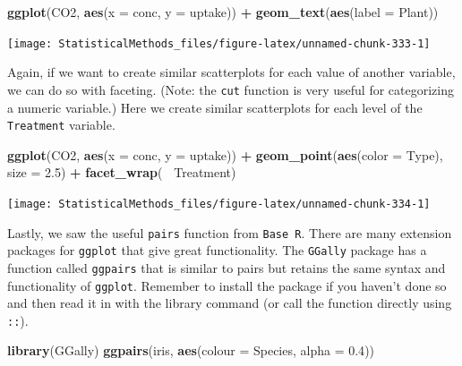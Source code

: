 \documentclass[
]{book}
\newenvironment{Shaded}{\begin{snugshade}}{\end{snugshade}}
\newcommand{\DataTypeTok}[1]{\textcolor[rgb]{0.13,0.29,0.53}{#1}}
\newcommand{\FloatTok}[1]{\textcolor[rgb]{0.00,0.00,0.81}{#1}}
\newcommand{\KeywordTok}[1]{\textcolor[rgb]{0.13,0.29,0.53}{\textbf{#1}}}
\newcommand{\NormalTok}[1]{#1}
\newcommand{\OperatorTok}[1]{\textcolor[rgb]{0.81,0.36,0.00}{\textbf{#1}}}
\newcommand{\StringTok}[1]{\textcolor[rgb]{0.31,0.60,0.02}{#1}}
\theoremstyle{definition}
\theoremstyle{definition}
\theoremstyle{definition}
\theoremstyle{remark}
\begin{document}
\begin{Shaded}
\begin{Highlighting}[]
\KeywordTok{ggplot}\NormalTok{(CO2, }\KeywordTok{aes}\NormalTok{(}\DataTypeTok{x =}\NormalTok{ conc, }\DataTypeTok{y =}\NormalTok{ uptake)) }\OperatorTok{+}\StringTok{ }
\StringTok{  }\KeywordTok{geom_text}\NormalTok{(}\KeywordTok{aes}\NormalTok{(}\DataTypeTok{label =}\NormalTok{ Plant))}
\end{Highlighting}
\end{Shaded}

\begin{center}\texttt{[image: StatisticalMethods\_files/figure-latex/unnamed-chunk-333-1]} \end{center}

Again, if we want to create similar scatterplots for each value of another variable, we can do so with faceting. (Note: the \texttt{cut} function is very useful for categorizing a numeric variable.) Here we create similar scatterplots for each level of the \texttt{Treatment} variable.

\begin{Shaded}
\begin{Highlighting}[]
\KeywordTok{ggplot}\NormalTok{(CO2, }\KeywordTok{aes}\NormalTok{(}\DataTypeTok{x =}\NormalTok{ conc, }\DataTypeTok{y =}\NormalTok{ uptake)) }\OperatorTok{+}\StringTok{ }
\StringTok{  }\KeywordTok{geom_point}\NormalTok{(}\KeywordTok{aes}\NormalTok{(}\DataTypeTok{color =}\NormalTok{ Type), }\DataTypeTok{size =} \FloatTok{2.5}\NormalTok{) }\OperatorTok{+}
\StringTok{  }\KeywordTok{facet_wrap}\NormalTok{(}\OperatorTok{~}\StringTok{ }\NormalTok{Treatment)}
\end{Highlighting}
\end{Shaded}

\begin{center}\texttt{[image: StatisticalMethods\_files/figure-latex/unnamed-chunk-334-1]} \end{center}

Lastly, we saw the useful \texttt{pairs} function from \texttt{Base\ R}. There are many extension packages for \texttt{ggplot} that give great functionality. The \texttt{GGally} package has a function called \texttt{ggpairs} that is similar to pairs but retains the same syntax and functionality of \texttt{ggplot}. Remember to install the package if you haven't done so and then read it in with the library command (or call the function directly using \texttt{::}).

\begin{Shaded}
\begin{Highlighting}[]
\KeywordTok{library}\NormalTok{(GGally)}
\KeywordTok{ggpairs}\NormalTok{(iris, }\KeywordTok{aes}\NormalTok{(}\DataTypeTok{colour =}\NormalTok{ Species, }\DataTypeTok{alpha =} \FloatTok{0.4}\NormalTok{))}
\end{Highlighting}
\end{Shaded}
\end{document}
